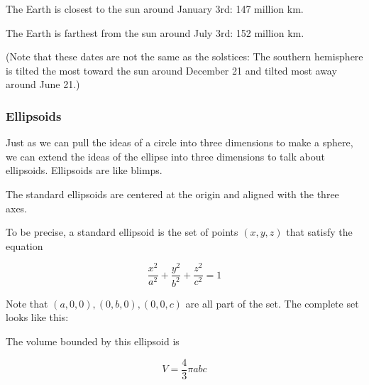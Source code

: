 The Earth is closest to the sun around January 3rd: 147 million km.

The Earth is farthest from the sun around July 3rd: 152 million km.

(Note that these dates are not the same as the solstices: The southern
hemisphere is tilted the most toward the sun around December 21 and
tilted most away around June 21.)

\subsubsection{Ellipsoids}

Just as we can pull the ideas of a circle into three dimensions to
make a sphere, we can extend the ideas of the ellipse into three
dimensions to talk about ellipsoids. Ellipsoids are like blimps.

The standard ellipsoids are centered at the origin and aligned with the three axes.

\begin{mdframed}[style=important, frametitle={Equation for a Standard Ellipsoid}]

  To be precise, a standard ellipsoid is the set of points $(x, y, z)$ that
  satisfy the equation

  $$\frac{x^2}{a^2} + \frac{y^2}{b^2} + \frac{z^2}{c^2}= 1$$


  Note that $(a,0,0), (0, b,0), (0,0,c)$ are all part of the
  set. The complete set looks like this:
  \begin{center}
  \end{center}

  The volume bounded by this ellipsoid is

  $$V = \frac{4}{3} \pi a b c$$


\end{mdframed}

